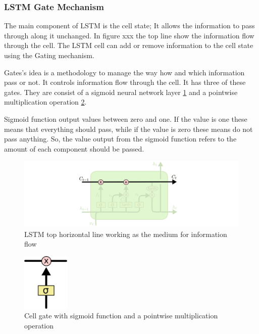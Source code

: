 \subsubsection{LSTM Gate Mechanism}

The main component of LSTM is the cell state; It allows the information to pass through along it unchanged. In figure xxx the top line show the information flow through the cell. The LSTM cell can add or remove information to the cell state using the Gating mechanism. 

Gates's idea is a methodology to manage the way how and which information pass or not. It controls information flow through the cell. It has three of these gates. They are consist of a sigmoid neural network layer \ref{fig:LSTM-Cell-state} and a pointwise multiplication operation \ref{fig:LSTM-gate}.

Sigmoid function output values between zero and one. If the value is one these means that everything should pass, while if the value is zero these means do not pass anything. So, the value output from the sigmoid function refers to the amount of each component should be passed.

\begin{figure}[h!]
    \centering
        \includegraphics[width=\textwidth]{./Figures/Ch_2_Background/LSTM-Cell-state.png}
        \caption{LSTM top horizontal line working as the medium for information flow \cite{colah}}
        \label{fig:LSTM-Cell-state}
\end{figure}
\begin{figure}[h!]
    \centering
        \includegraphics[width=0.2\textwidth]{./Figures/Ch_2_Background/LSTM-gate.png}
        \caption{Cell gate with sigmoid function and a pointwise multiplication operation \cite{colah}}
        \label{fig:LSTM-gate}
\end{figure}

